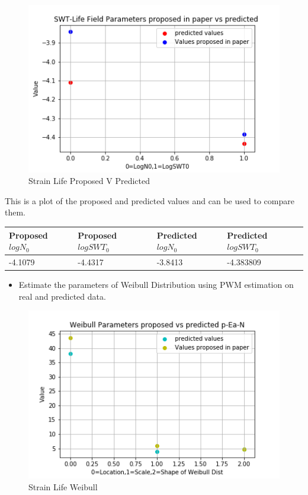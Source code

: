 \documentclass[11pt]{article}
\providecommand{\tightlist}{%
      \setlength{\itemsep}{0pt}\setlength{\parskip}{0pt}}
\begin{document}
\begin{figure}
\centering
\includegraphics{images/SWTLifePropvPred.png}
\caption{Strain Life Proposed V Predicted}
\end{figure}

This is a plot of the proposed and predicted values and can be used to
compare them.

\begin{longtable}[]{@{}llll@{}}
\toprule
Proposed \(logN_0\) & Proposed \(logSWT_0\) & Predicted \(logN_0\) &
Predicted \(logSWT_0\)\tabularnewline
\midrule
\endhead
-4.1079 & -4.4317 & -3.8413 & -4.383809\tabularnewline
\bottomrule
\end{longtable}

\begin{itemize}
\tightlist
\item
  Estimate the parameters of Weibull Distribution using PWM estimation
  on real and predicted data.
\end{itemize}

\begin{figure}
\centering
\includegraphics{images/PWMPlotstrain.png}
\caption{Strain Life Weibull}
\end{figure}
\end{document}
